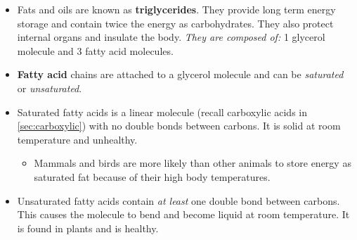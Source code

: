 \documentclass[letterpaper]{article}
\begin{document}
\begin{itemize}
    \subsection{Lipids}
    \begin{idea}
        Lipids are hydrophobic macromolecules that are separated into four groups:
        \begin{multicols}{2}
            \begin{itemize}
                \item Fats and Oils
                \item Phospholipids
                \item Waxes
                \item Steroids
            \end{itemize}
        \end{multicols}
        They have many functions, which include:
        \begin{itemize}
            \item Fats act as a concentrated energy source.
            \item Phospholipids and cholesterol act as structural components of cell membranes.
            \item Steroid hormones are useful for communication.
            \item Waxes create protection from water.
        \end{itemize}
    \end{idea}
    \item Fats and oils are known as \textbf{triglycerides}. They provide long term energy storage and contain twice the energy as carbohydrates. They also protect internal organs and insulate the body. \textit{They are composed of:} 1 glycerol molecule and 3 fatty acid molecules.
    \item \textbf{Fatty acid} chains are attached to a glycerol molecule and can be \textit{saturated} or \textit{unsaturated}.
    \item Saturated fatty acids is a linear molecule (recall carboxylic acids in \ref{sec:carboxylic}) with no double bonds between carbons. It is solid at room temperature and unhealthy.
    \begin{itemize}
        \item Mammals and birds are more likely than other animals to store energy as saturated fat because of their high body temperatures.
    \end{itemize}
    \item Unsaturated fatty acids contain \textit{at least} one double bond between carbons. This causes the molecule to bend and become liquid at room temperature. It is found in plants and is healthy.

\end{itemize}
\end{document}
